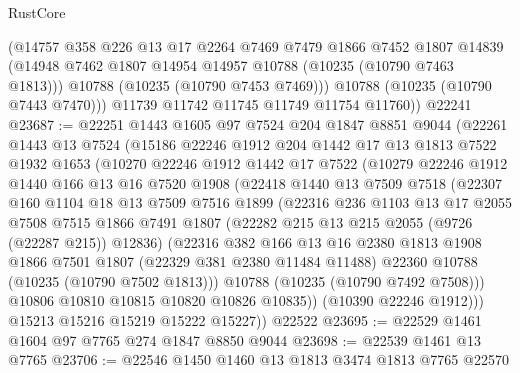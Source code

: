 \begin{lexlean}{RustCore}
\begin{coremodule}
          (@14757
            @358
            @226
            @13
            @17
            @2264
            @7469
            @7479
            @1866
            @7452
            @1807
            @14839
            (@14948 @7462 @1807 @14954 @14957 @10788 (@10235 (@10790 @7463 @1813)))
            @10788
            (@10235 (@10790 @7453 @7469)))
          @10788
          (@10235 (@10790 @7443 @7470)))
        @11739
        @11742
        @11745
        @11749
        @11754
        @11760))
    @22241
@23687 := @22251
    @1443
    @1605
    @97
    @7524
    @204
    @1847
    @8851
    @9044
    (@22261
      @1443
      @13
      @7524
      (@15186
        @22246
        @1912
        @204
        @1442
        @17
        @13
        @1813
        @7522
        @1932
        @1653
        (@10270
          @22246
          @1912
          @1442
          @17
          @7522
          (@10279
            @22246
            @1912
            @1440
            @166
            @13
            @16
            @7520
            @1908
            (@22418
              @1440
              @13
              @7509
              @7518
              (@22307
                @160
                @1104
                @18
                @13
                @7509
                @7516
                @1899
                (@22316
                  @236
                  @1103
                  @13
                  @17
                  @2055
                  @7508
                  @7515
                  @1866
                  @7491
                  @1807
                  (@22282 @215 @13 @215 @2055 (@9726 (@22287 @215)) @12836)
                  (@22316
                    @382
                    @166
                    @13
                    @16
                    @2380
                    @1813
                    @1908
                    @1866
                    @7501
                    @1807
                    (@22329 @381 @2380 @11484 @11488)
                    @22360
                    @10788
                    (@10235 (@10790 @7502 @1813)))
                  @10788
                  (@10235 (@10790 @7492 @7508)))
                @10806
                @10810
                @10815
                @10820
                @10826
                @10835))
            (@10390 @22246 @1912)))
        @15213
        @15216
        @15219
        @15222
        @15227))
    @22522
@23695 := @22529 @1461 @1604 @97 @7765 @274 @1847 @8850 @9044
@23698 := @22539 @1461 @13 @7765
@23706 := @22546 @1450 @1460 @13 @1813 @3474 @1813 @7765 @22570

\end{coremodule}
\end{lexlean}
